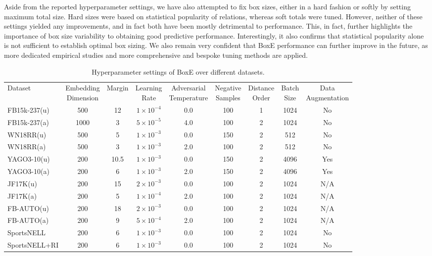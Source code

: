 \documentclass{article}
\begin{document}
Aside from the reported hyperparameter settings, we have also attempted  to fix box sizes, either in a hard fashion or softly by setting maximum total size. Hard sizes were based on statistical popularity of relations, whereas soft totals were tuned. However, neither of these settings yielded any improvements, and in fact both have been mostly detrimental to performance. This, in fact, further highlights the importance of box size variability to obtaining good predictive performance. Interestingly, it also confirms that statistical popularity alone is not sufficient to establish optimal box sizing. We also remain very confident that BoxE performance can further improve in the future, as more dedicated empirical studies and more comprehensive and bespoke tuning methods are applied. 
\begin{table}[t!] 
	\centering
	\caption{Hyperparameter settings of BoxE over different datasets.} 
	\label{tab:HPSettings} 
	\small\addtolength{\tabcolsep}{-1pt}
	\begin{tabular}{l@{\hskip 6pt}c@{\hskip 4pt}c@{\hskip 4pt}c@{\hskip 4pt}c@{\hskip 4pt}c@{\hskip 4pt}c@{\hskip 4pt}c@{\hskip 4pt}c@{\hskip 4pt}}
		\toprule 
		Dataset & \makecell[l]{Embedding \\ Dimension} & Margin & \makecell[l]{Learning \\ Rate} & \makecell[l]{Adversarial \\ Temperature} & \makecell[l]{Negative \\Samples } & \makecell[l]{Distance \\ Order} & \makecell[l]{Batch \\ Size} & \makecell[l]{Data \\ Augmentation}\\
		\cmidrule{2-9}
		FB15k-237(u) & 500 & 12 & $1\times10^{-4}$ & 0.0 & 100 & 1 & 1024 & No\\
		FB15k-237(a) & 1000 & 3 & $5\times10^{-5}$ & 4.0 & 100 & 2 & 1024 & No\\
		WN18RR(u) & 500 & 5 & $1\times10^{-3}$ & 0.0 & 150 & 2 & 512 & No\\
		WN18RR(a) & 500 & 3 & $1\times10^{-3}$ & 2.0 & 100 & 2 & 512 & No\\
		YAGO3-10(u) & 200 & 10.5 & $1\times10^{-3}$ & 0.0 & 150 & 2 & 4096 & Yes\\
		YAGO3-10(a) & 200 & 6 & $1\times10^{-3}$ & 2.0 & 150 & 2 & 4096 & Yes\\
		JF17K(u) & 200 & 15 & $2\times10^{-3}$ & 0.0 & 100 & 2 & 1024 & N/A\\
		JF17K(a) & 200 & 5 & $1\times10^{-4}$ & 2.0 & 100 & 2 & 1024& N/A\\
		FB-AUTO(u) & 200 & 18 & $2\times10^{-3}$ & 0.0 & 100 & 2 & 1024 & N/A\\
		FB-AUTO(a) & 200 & 9 & $5\times10^{-4}$ & 2.0 & 100 & 2 & 1024 & N/A\\
		SportsNELL & 200 & 6 & $1\times10^{-3}$ & 0.0 & 100 & 2 & 1024 & No\\
		SportsNELL+RI & 200 & 6 & $1\times10^{-3}$ & 0.0 & 100 & 2 & 1024& No\\
		\bottomrule
	\end{tabular}
\end{table}
\end{document}
